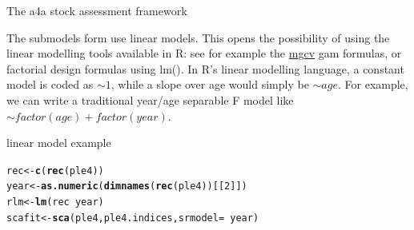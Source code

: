 \documentclass{beamer}\usepackage[]{graphicx}\usepackage[]{color}
\makeatletter
\newcommand{\hlnum}[1]{\textcolor[rgb]{0.686,0.059,0.569}{#1}}%
\newcommand{\hlopt}[1]{\textcolor[rgb]{0,0,0}{#1}}%
\newcommand{\hlstd}[1]{\textcolor[rgb]{0.345,0.345,0.345}{#1}}%
\newcommand{\hlkwb}[1]{\textcolor[rgb]{0.69,0.353,0.396}{#1}}%
\newcommand{\hlkwc}[1]{\textcolor[rgb]{0.333,0.667,0.333}{#1}}%
\newcommand{\hlkwd}[1]{\textcolor[rgb]{0.737,0.353,0.396}{\textbf{#1}}}%
\newenvironment{kframe}{%
 \def\at@end@of@kframe{}%
 \ifinner\ifhmode%
  \def\at@end@of@kframe{\end{minipage}}%
  \begin{minipage}{\columnwidth}%
 \fi\fi%
 \def\FrameCommand##1{\hskip\@totalleftmargin \hskip-\fboxsep
 \colorbox{shadecolor}{##1}\hskip-\fboxsep
     \hskip-\linewidth \hskip-\@totalleftmargin \hskip\columnwidth}%
 \MakeFramed {\advance\hsize-\width
   \@totalleftmargin\z@ \linewidth\hsize
   \@setminipage}}%
 {\par\unskip\endMakeFramed%
 \at@end@of@kframe}
\newenvironment{knitrout}{}{} %
\makeatother
\begin{document}
\begin{frame}{The a4a stock assessment framework}

The submodels form use linear models. This opens the possibility of using the linear modelling tools available in R: see for example the \href{http://cran.r-project.org/web/packages/mgcv/index.html}{mgcv} gam formulas, or factorial design formulas using lm(). In R's linear modelling language, a constant model is coded as $\sim 1$, while a slope over age would simply be $\sim age$. For example, we can write a traditional year/age separable F model like $\sim factor(age) + factor(year)$.

\end{frame}

\begin{frame}{linear model example}

\begin{knitrout}
\color{fgcolor}\begin{kframe}
\begin{alltt}
\hlstd{rec} \hlkwb{<-} \hlkwd{c}\hlstd{(}\hlkwd{rec}\hlstd{(ple4))}
\hlstd{year} \hlkwb{<-} \hlkwd{as.numeric}\hlstd{(}\hlkwd{dimnames}\hlstd{(}\hlkwd{rec}\hlstd{(ple4))[[}\hlnum{2}\hlstd{]])}
\hlstd{rlm} \hlkwb{<-} \hlkwd{lm}\hlstd{(rec} \hlopt{~} \hlstd{year)}
\hlstd{scafit} \hlkwb{<-} \hlkwd{sca}\hlstd{(ple4, ple4.indices,} \hlkwc{srmodel} \hlstd{=} \hlopt{~}\hlstd{year)}
\end{alltt}
\end{kframe}
\end{knitrout}


\end{frame}
\end{document}
